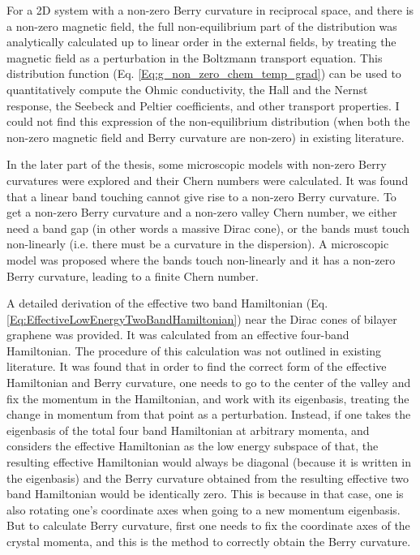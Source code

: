 \documentclass{report}
\begin{document}
For a 2D system with a non-zero Berry curvature in reciprocal space, and there is a non-zero magnetic field, the full non-equilibrium part of the distribution was analytically calculated up to linear order in the external fields, by treating the magnetic field as a perturbation in the Boltzmann transport equation. This distribution function (Eq. \eqref{Eq:g_non_zero_chem_temp_grad}) can be used to quantitatively compute the Ohmic conductivity, the Hall and the Nernst response, the Seebeck and Peltier coefficients, and other transport properties. I could not find this expression of the non-equilibrium distribution (when both the non-zero magnetic field and Berry curvature are non-zero) in existing literature.

In the later part of the thesis, some microscopic models with non-zero Berry curvatures were explored and their Chern numbers were calculated. It was found that a linear band touching cannot give rise to a non-zero Berry curvature. To get a non-zero Berry curvature and a non-zero valley Chern number, we either need a band gap (in other words a massive Dirac cone), or the bands must touch non-linearly (i.e. there must be a curvature in the dispersion). A microscopic model was proposed where the bands touch non-linearly and it has a non-zero Berry curvature, leading to a finite Chern number.

A detailed derivation of the effective two band Hamiltonian (Eq. \eqref{Eq:EffectiveLowEnergyTwoBandHamiltonian}) near the Dirac cones of bilayer graphene was provided. It was calculated from an effective four-band Hamiltonian. The procedure of this calculation was not outlined in existing literature. It was found that in order to find the correct form of the effective Hamiltonian and Berry curvature, one needs to go to the center of the valley and fix the momentum in the Hamiltonian, and work with its eigenbasis, treating the change in momentum from that point as a perturbation. Instead, if one takes the eigenbasis of the total four band Hamiltonian at arbitrary momenta, and considers the effective Hamiltonian as the low energy subspace of that, the resulting effective Hamiltonian would always be diagonal (because it is written in the eigenbasis) and the Berry curvature obtained from the resulting effective two band Hamiltonian would be identically zero. This is because in that case, one is also rotating one's coordinate axes when going to a new momentum eigenbasis. But to calculate Berry curvature, first one needs to fix the coordinate axes of the crystal momenta, and this is the method to correctly obtain the Berry curvature.
\end{document}
